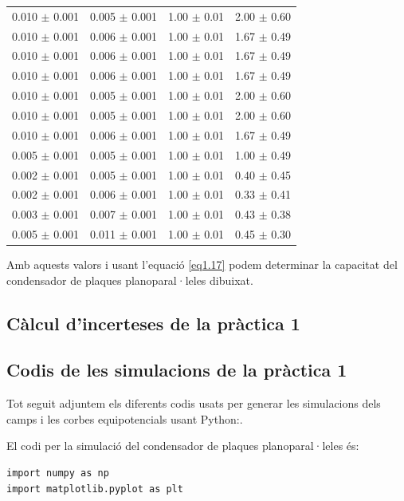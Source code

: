 \documentclass[a4paper,10.5pt]{report}
\begin{document}
\begin{appendices}
\begin{table}[h]
\begin{tabular}{cccc}
		0.010 $\pm$ 0.001 & 0.005 $\pm$ 0.001 & 1.00 $\pm$ 0.01 & 2.00 $\pm$ 0.60 \\
		0.010 $\pm$ 0.001 & 0.006 $\pm$ 0.001 & 1.00 $\pm$ 0.01 & 1.67 $\pm$ 0.49 \\
		0.010 $\pm$ 0.001 & 0.006 $\pm$ 0.001 & 1.00 $\pm$ 0.01 & 1.67 $\pm$ 0.49 \\
		0.010 $\pm$ 0.001 & 0.006 $\pm$ 0.001 & 1.00 $\pm$ 0.01 & 1.67 $\pm$ 0.49 \\
		0.010 $\pm$ 0.001 & 0.005 $\pm$ 0.001 & 1.00 $\pm$ 0.01 & 2.00 $\pm$ 0.60 \\
		0.010 $\pm$ 0.001 & 0.005 $\pm$ 0.001 & 1.00 $\pm$ 0.01 & 2.00 $\pm$ 0.60 \\
		0.010 $\pm$ 0.001 & 0.006 $\pm$ 0.001 & 1.00 $\pm$ 0.01 & 1.67 $\pm$ 0.49 \\
		0.005 $\pm$ 0.001 & 0.005 $\pm$ 0.001 & 1.00 $\pm$ 0.01 & 1.00 $\pm$ 0.49 \\
		0.002 $\pm$ 0.001 & 0.005 $\pm$ 0.001 & 1.00 $\pm$ 0.01 & 0.40 $\pm$ 0.45 \\
		0.002 $\pm$ 0.001 & 0.006 $\pm$ 0.001 & 1.00 $\pm$ 0.01 & 0.33 $\pm$ 0.41 \\
		0.003 $\pm$ 0.001 & 0.007 $\pm$ 0.001 & 1.00 $\pm$ 0.01 & 0.43 $\pm$ 0.38 \\
		0.005 $\pm$ 0.001 & 0.011 $\pm$ 0.001 & 1.00 $\pm$ 0.01 & 0.45 $\pm$ 0.30 \\
		\bottomrule
	\end{tabular}
	\label{tab:valores}
\end{table}

Amb aquests valors i usant l'equació \eqref{eq1.17} podem determinar la capacitat del condensador de plaques planoparal·leles dibuixat.

\newpage
\subsection{Càlcul d'incerteses de la pràctica 1}
\label{an:a3}

\newpage
\subsection{Codis de les simulacions de la pràctica 1}
\label{an:a4}
Tot seguit adjuntem els diferents codis usats per generar les simulacions dels camps i les corbes equipotencials usant Python:.

El codi per la simulació del condensador de plaques planoparal·leles és:
\begin{lstlisting}
import numpy as np
import matplotlib.pyplot as plt


\end{lstlisting}
\end{appendices}
\end{document}
